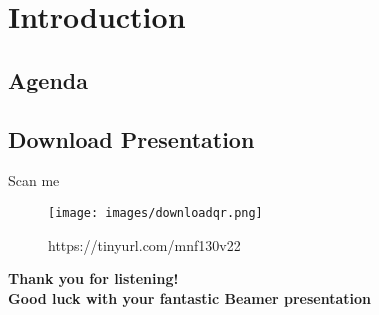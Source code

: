 
\begin{frame}[t,plain]
    \titlepage
\end{frame}

\section{Introduction}
\subsection*{Agenda}
\begin{frame}
    \tableofcontents
    
\end{frame}

\subsection*{Download Presentation}
\begin{frame}{Scan me}
    \begin{figure}
        \centering
        \texttt{[image: images/downloadqr.png]}
        \caption{https://tinyurl.com/mnf130v22}
        \label{fig:qrcode}
    \end{figure}
\end{frame}



\begin{frame}
\begin{center}
\begin{Large}
\textbf{Thank you for listening!\\[5mm]
Good luck with your fantastic Beamer presentation}

\end{Large}
\end{center}  
\end{frame}